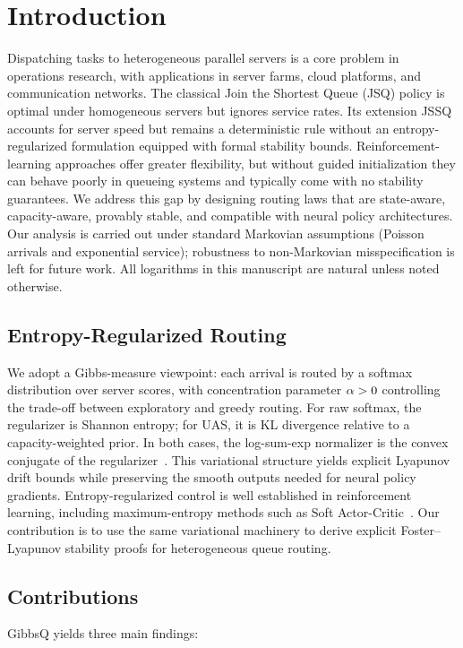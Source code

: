 
\section{Introduction}
\label{sec:introduction}

Dispatching tasks to heterogeneous parallel servers is a core problem in operations research, with applications in server farms, cloud platforms, and communication networks.
The classical Join the Shortest Queue (JSQ) policy is optimal under homogeneous servers but ignores service rates.
Its extension JSSQ accounts for server speed but remains a deterministic rule without an entropy-regularized formulation equipped with formal stability bounds.
Reinforcement-learning approaches offer greater flexibility, but without guided initialization they can behave poorly in queueing systems and typically come with no stability guarantees.
We address this gap by designing routing laws that are state-aware, capacity-aware, provably stable, and compatible with neural policy architectures. Our analysis is carried out under standard Markovian assumptions (Poisson arrivals and exponential service); robustness to non-Markovian misspecification is left for future work. All logarithms in this manuscript are natural unless noted otherwise.

\subsection{Entropy-Regularized Routing}
We adopt a Gibbs-measure viewpoint: each arrival is routed by a softmax distribution over server scores, with concentration parameter $\alpha > 0$ controlling the trade-off between exploratory and greedy routing.
For raw softmax, the regularizer is Shannon entropy; for UAS, it is KL divergence relative to a capacity-weighted prior.
In both cases, the log-sum-exp normalizer is the convex conjugate of the regularizer~\cite{boyd2004convex}. This variational structure yields explicit Lyapunov drift bounds while preserving the smooth outputs needed for neural policy gradients.
Entropy-regularized control is well established in reinforcement learning, including maximum-entropy methods such as Soft Actor-Critic~\cite{haarnoja2018soft}. Our contribution is to use the same variational machinery to derive explicit Foster--Lyapunov stability proofs for heterogeneous queue routing.

\subsection{Contributions}
GibbsQ yields three main findings:

